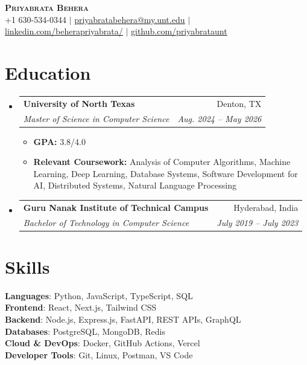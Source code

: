 \documentclass[letterpaper,10pt]{article}
\makeatletter
\newcommand{\resumeItem}[1]{
  \item\small{
    {#1 \vspace{-2pt}}
  }
}
\newcommand{\resumeSubheading}[4]{
  \vspace{-2pt}\item
    \begin{tabular*}{0.97\textwidth}[t]{l@{\extracolsep{\fill}}r}
      \textbf{#1} & #2 \\
      \textit{\small#3} & \textit{\small #4} \\
    \end{tabular*}\vspace{-7pt}
}
\newcommand{\resumeSubHeadingListStart}{\begin{itemize}[leftmargin=0.15in, label={}]}
\newcommand{\resumeSubHeadingListEnd}{\end{itemize}}
\newcommand{\resumeItemListStart}{\begin{itemize}}
\newcommand{\resumeItemListEnd}{\end{itemize}\vspace{-5pt}}
\makeatother
\begin{document}
\begin{center}
    \textbf{\Huge \scshape Priyabrata Behera} \\ \vspace{1pt}
    \small +1 630-534-0344 $|$ \href{mailto:priyabratabehera@my.unt.edu}{\underline{priyabratabehera@my.unt.edu}} $|$ 
    \href{https://www.linkedin.com/in/beherapriyabrata/}{\underline{linkedin.com/beherapriyabrata/}} $|$
    \href{https://github.com/priyabrataunt}{\underline{github.com/priyabrataunt}}
\end{center}

\section{Education}
  \resumeSubHeadingListStart
    \resumeSubheading
      {University of North Texas}{Denton, TX}
      {Master of Science in Computer Science}{Aug. 2024 -- May 2026}
      \resumeItemListStart
        \resumeItem{\textbf{GPA:} 3.8/4.0}
        \resumeItem{\textbf{Relevant Coursework:} Analysis of Computer Algorithms, Machine Learning, Deep Learning, Database Systems, Software Development for AI, Distributed Systems, Natural Language Processing}
      \resumeItemListEnd
    \resumeSubheading
  {Guru Nanak Institute of Technical Campus}{Hyderabad, India}
  {Bachelor of Technology in Computer Science}{July 2019 -- July 2023}
  \resumeSubHeadingListEnd

\section{Skills}
 \begin{itemize}[leftmargin=0.15in, label={}]
    \small{\item{
     \textbf{Languages}{: Python, JavaScript, TypeScript, SQL} \\
     \textbf{Frontend}{: React, Next.js, Tailwind CSS} \\
     \textbf{Backend}{: Node.js, Express.js, FastAPI, REST APIs, GraphQL} \\
     \textbf{Databases}{: PostgreSQL, MongoDB, Redis} \\
     \textbf{Cloud \& DevOps}{: Docker, GitHub Actions, Vercel} \\
     \textbf{Developer Tools}{: Git, Linux, Postman, VS Code}
    }}
 \end{itemize}
    
\end{document}
